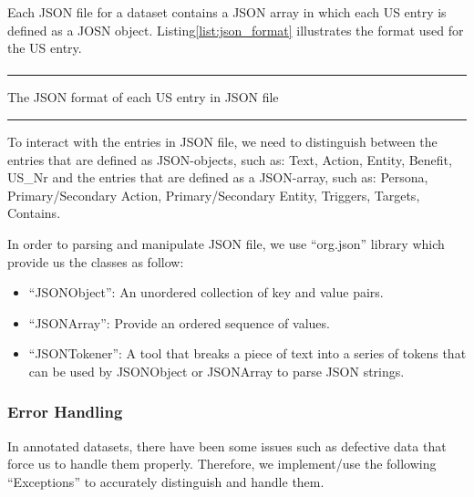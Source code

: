 Each JSON file for a dataset contains a JSON array in which each US entry is defined as a JOSN object. Listing\ref{list:json_format} illustrates the format used for the US entry.
\begin{MyListing}
	\paragraph{}
	\hrule
	\centering
	
	\caption{The JSON format of each US entry in JSON file}\label{list:textual_report_sample}
	\hrule
\end{MyListing}
To interact with the entries in JSON file, we need to distinguish between the entries that are defined as JSON-objects, such as: {Text, Action, Entity, Benefit, US\_Nr} and the entries that are defined as a JSON-array, such as: {Persona, Primary/Secondary Action, Primary/Secondary Entity, Triggers, Targets, Contains}.

In order to parsing and manipulate JSON file, we use \enquote{org.json} library which provide us the classes as follow:
\begin{itemize}
	\item \enquote{JSONObject}: An unordered collection of key and value pairs.
	\item \enquote{JSONArray}: Provide an ordered sequence of values.
	 \item \enquote{JSONTokener}: A tool that breaks a piece of text into a series of tokens that can be used by JSONObject or JSONArray to parse JSON strings.
\end{itemize}

\subsubsection*{Error Handling}
In annotated datasets, there have been some issues such as defective data that force us to handle them properly. Therefore, we implement/use the following \enquote{Exceptions} to accurately distinguish and handle them.

